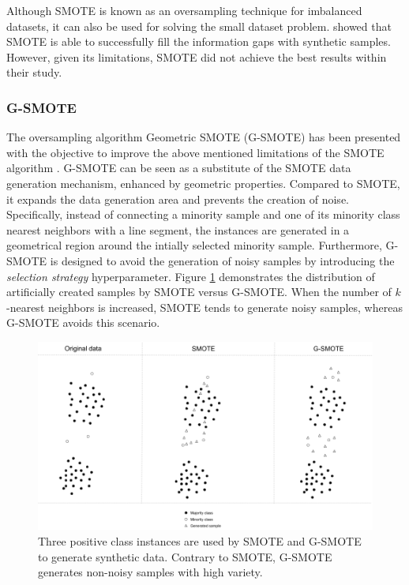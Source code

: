 \documentclass[parskip=full]{scrartcl}
\begin{document}
Although SMOTE is known as an oversampling technique for imbalanced datasets, it can also be used for solving the small dataset problem. \cite{Li.2018} showed that SMOTE is able to successfully fill the information gaps with synthetic samples. However, given its limitations, SMOTE did not achieve the best results within their study.

\subsubsection{G-SMOTE}

The oversampling algorithm Geometric SMOTE (G-SMOTE) has been presented with the objective to improve the above mentioned limitations of the SMOTE algorithm \cite{Douzas.2019}. G-SMOTE can be seen as a substitute of the SMOTE data generation mechanism, enhanced by geometric properties. Compared to SMOTE, it expands the data generation area and prevents the creation of noise. Specifically, instead of connecting a minority sample and one of its minority class nearest neighbors with a line segment, the instances are generated in a geometrical region around the intially selected minority sample. Furthermore, G-SMOTE is designed to avoid the generation of noisy samples by introducing the \textit{selection strategy} hyperparameter. Figure \ref{fig:smotevsgsmote} demonstrates the distribution of artificially created samples by SMOTE versus G-SMOTE. When the number of \( k \)-nearest neighbors is increased, SMOTE tends to generate noisy samples, whereas G-SMOTE avoids this scenario.

\begin{figure}[H]
	\centering
	\includegraphics[width=1\linewidth]{../analysis/smote_vs_gsmote}
	\caption{Three positive class instances are used by SMOTE and G-SMOTE 
	to generate synthetic data. Contrary to SMOTE, G-SMOTE generates non-noisy samples with high variety.}
	\label{fig:smotevsgsmote}
\end{figure}
\end{document}
